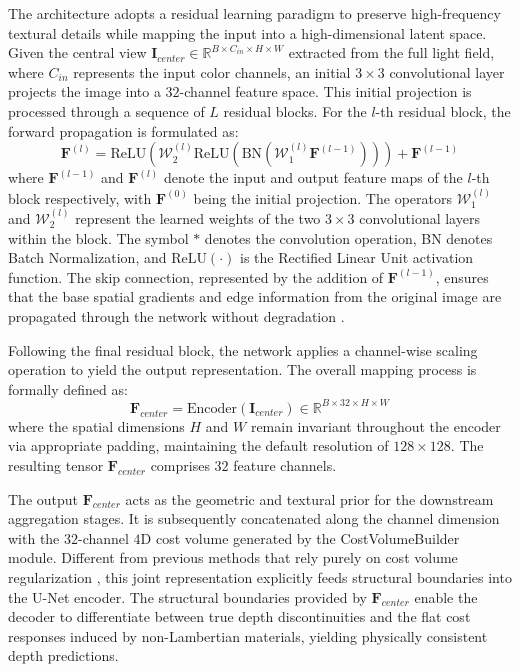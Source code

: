 \documentclass[lettersize,journal]{IEEEtran}
\begin{document}
The architecture adopts a residual learning paradigm to preserve high-frequency textural details while mapping the input into a high-dimensional latent space. Given the central view $\mathbf{I}_{center} \in \mathbb{R}^{B \times C_{in} \times H \times W}$ extracted from the full light field, where $C_{in}$ represents the input color channels, an initial $3 \times 3$ convolutional layer projects the image into a $32$-channel feature space. This initial projection is processed through a sequence of $L$ residual blocks. For the $l$-th residual block, the forward propagation is formulated as:
\begin{equation}
\mathbf{F}^{(l)} = \text{ReLU}\left( \mathcal{W}_2^{(l)}  \text{ReLU}\left( \text{BN}\left( \mathcal{W}_1^{(l)}  \mathbf{F}^{(l-1)} \right) \right) \right) + \mathbf{F}^{(l-1)}
\end{equation}
where $\mathbf{F}^{(l-1)}$ and $\mathbf{F}^{(l)}$ denote the input and output feature maps of the $l$-th block respectively, with $\mathbf{F}^{(0)}$ being the initial projection. The operators $\mathcal{W}_1^{(l)}$ and $\mathcal{W}_2^{(l)}$ represent the learned weights of the two $3 \times 3$ convolutional layers within the block. The symbol $*$ denotes the convolution operation, BN denotes Batch Normalization, and $\text{ReLU}(\cdot)$ is the Rectified Linear Unit activation function. The skip connection, represented by the addition of $\mathbf{F}^{(l-1)}$, ensures that the base spatial gradients and edge information from the original image are propagated through the network without degradation \cite{he2016}. 

Following the final residual block, the network applies a channel-wise scaling operation to yield the output representation. The overall mapping process is formally defined as:
\begin{equation}
\mathbf{F}_{center} = \text{Encoder}(\mathbf{I}_{center}) \in \mathbb{R}^{B \times 32 \times H \times W}
\end{equation}
where the spatial dimensions $H$ and $W$ remain invariant throughout the encoder via appropriate padding, maintaining the default resolution of $128 \times 128$. The resulting tensor $\mathbf{F}_{center}$ comprises $32$ feature channels. 

The output $\mathbf{F}_{center}$ acts as the geometric and textural prior for the downstream aggregation stages. It is subsequently concatenated along the channel dimension with the $32$-channel $4$D cost volume generated by the CostVolumeBuilder module. Different from previous methods that rely purely on cost volume regularization \cite{wang2023}, this joint representation explicitly feeds structural boundaries into the U-Net encoder. The structural boundaries provided by $\mathbf{F}_{center}$ enable the decoder to differentiate between true depth discontinuities and the flat cost responses induced by non-Lambertian materials, yielding physically consistent depth predictions.
\end{document}

